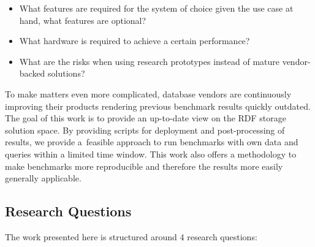 \begin{itemize}
	\item What features are required for the system of choice given the use case at hand, what features are optional?
	\item What hardware is required to achieve a certain performance?
	\item What are the risks when using research prototypes instead of mature vendor-backed solutions? 
\end{itemize}

To make matters even more complicated, database vendors are continuously improving their products rendering previous benchmark results quickly outdated.
The goal of this work is to provide an up-to-date view on the RDF storage solution space.
By providing scripts for deployment and post-processing of results, we provide a~feasible approach to run benchmarks with own data and queries within a limited time window.
This work also offers a methodology to make benchmarks more reproducible and therefore the results more easily generally applicable.

\subsection{Research Questions}

The work presented here is structured around 4 research questions:

